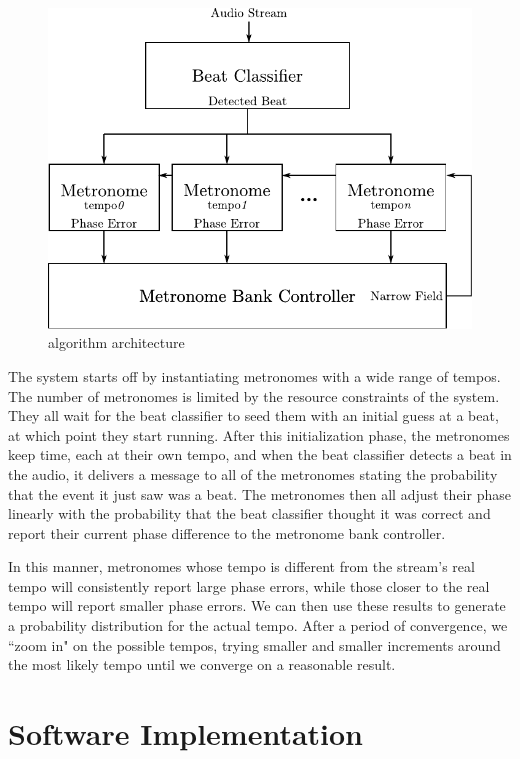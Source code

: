 \documentclass[letterpaper]{article}
\begin{document}
    \begin{figure}
        \centering
        \includegraphics{fig/architecture.pdf}
        \caption{\projname algorithm architecture}
        \label{fig:architecture}
    \end{figure}

    The system starts off by instantiating metronomes with a wide range of
    tempos.  The number of metronomes is limited by the resource constraints of
    the system.  They all wait for the beat classifier to seed them with an
    initial guess at a beat, at which point they start running.  After this
    initialization phase, the metronomes keep time, each at their own tempo,
    and when the beat classifier detects a beat in the audio, it delivers a
    message to all of the metronomes stating the probability that the event it
    just saw was a beat.  The metronomes then all adjust their phase linearly
    with the probability that the beat classifier thought it was correct and
    report their current phase difference to the metronome bank controller.

    In this manner, metronomes whose tempo is different from the stream's real
    tempo will consistently report large phase errors, while those closer to
    the real tempo will report smaller phase errors.  We can then use these
    results to generate a probability distribution for the actual tempo.  After
    a period of convergence, we ``zoom in" on the possible tempos, trying
    smaller and smaller increments around the most likely tempo until we
    converge on a reasonable result.


\section{Software Implementation}
\end{document}
